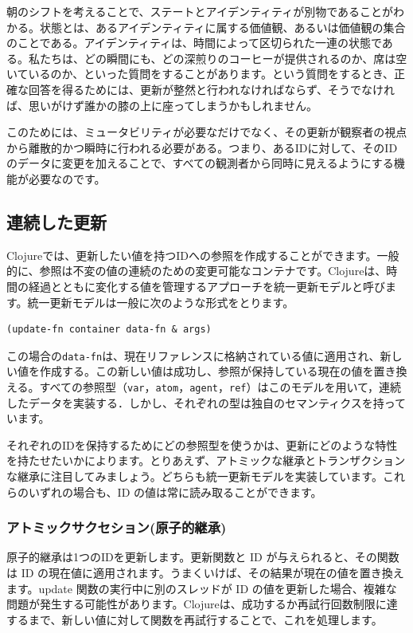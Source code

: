 朝のシフトを考えることで、ステートとアイデンティティが別物であることがわかる。状態とは、あるアイデンティティに属する価値観、あるいは価値観の集合のことである。アイデンティティは、時間によって区切られた一連の状態である。私たちは、どの瞬間にも、どの深煎りのコーヒーが提供されるのか、席は空いているのか、といった質問をすることがあります。という質問をするとき、正確な回答を得るためには、更新が整然と行われなければならず、そうでなければ、思いがけず誰かの膝の上に座ってしまうかもしれません。

このためには、ミュータビリティが必要なだけでなく、その更新が観察者の視点から離散的かつ瞬時に行われる必要がある。つまり、あるIDに対して、そのIDのデータに変更を加えることで、すべての観測者から同時に見えるようにする機能が必要なのです。


\subsection{連続した更新}

Clojureでは、更新したい値を持つIDへの参照を作成することができます。一般的に、参照は不変の値の連続のための変更可能なコンテナです。Clojureは、時間の経過とともに変化する値を管理するアプローチを統一更新モデルと呼びます。統一更新モデルは一般に次のような形式をとります。


\begin{lstlisting}[numbers=none]
(update-fn container data-fn & args)
\end{lstlisting}


この場合の\texttt{data-fn}は、現在リファレンスに格納されている値に適用され、新しい値を作成する。この新しい値は成功し、参照が保持している現在の値を置き換える。すべての参照型（\texttt{var}，\texttt{atom}，\texttt{agent}，\texttt{ref}）はこのモデルを用いて，連続したデータを実装する．しかし、それぞれの型は独自のセマンティクスを持っています。

それぞれのIDを保持するためにどの参照型を使うかは、更新にどのような特性を持たせたいかによります。とりあえず、アトミックな継承とトランザクションな継承に注目してみましょう。どちらも統一更新モデルを実装しています。これらのいずれの場合も、ID の値は常に読み取ることができます。


\subsubsection{アトミックサクセション(原子的継承)}

原子的継承は1つのIDを更新します。更新関数と ID が与えられると、その関数は ID の現在値に適用されます。うまくいけば、その結果が現在の値を置き換えます。update 関数の実行中に別のスレッドが ID の値を更新した場合、複雑な問題が発生する可能性があります。Clojureは、成功するか再試行回数制限に達するまで、新しい値に対して関数を再試行することで、これを処理します。

